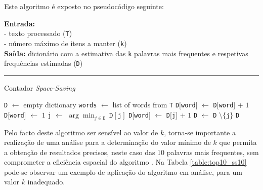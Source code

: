 \documentclass[mirror, portugues]{revdetua}
\begin{document}
Este algoritmo é exposto no pseudocódigo seguinte:

\begin{algorithm}[H]
\raggedright
\textbf{Entrada:} \\
- texto processado (\texttt{T}) \\
- número máximo de itens a manter (\texttt{k}) \\
\textbf{Saída:} dicionário com a estimativa das \texttt{k} palavras mais frequentes e respetivas frequências estimadas (\texttt{D}) \\
\hrule 
\caption{Contador \textit{Space-Saving} \cite{CG09}}
\begin{algorithmic}[1]
    \State \texttt{D} $\gets$ empty dictionary
    \State \texttt{words} $\gets$ list of words from \texttt{T}
            \State \texttt{D}[\texttt{word}] $\gets$ \texttt{D}[\texttt{word}] + $1$
            \State \texttt{D}[\texttt{word}] $\gets$ $1$
        \Else
            \State \texttt{j} $\gets$ $\arg \min_{j \in \texttt{D}}\ \texttt{D}[\texttt{j}]$
            \State \texttt{D}[\texttt{word}] $\gets$ \texttt{D}[\texttt{j}] + $1$
            \State \texttt{D} $\gets$ \texttt{D} $\setminus \{\texttt{j}\}$
        \EndIf
    \EndFor
    \State \Return \texttt{D}
\end{algorithmic}
\end{algorithm}

Pelo facto deste algoritmo ser sensível ao valor de $k$, torna-se importante a realização de uma análise para a determinação do valor mínimo de $k$ que permita a obtenção de resultados precisos, neste caso das 10 palavras mais frequentes, sem comprometer a eficiência espacial do algoritmo \cite{ZF22}. Na Tabela \ref{table:top10_ss10} pode-se observar um exemplo de aplicação do algoritmo em análise, para um valor $k$ inadequado.
\end{document}
